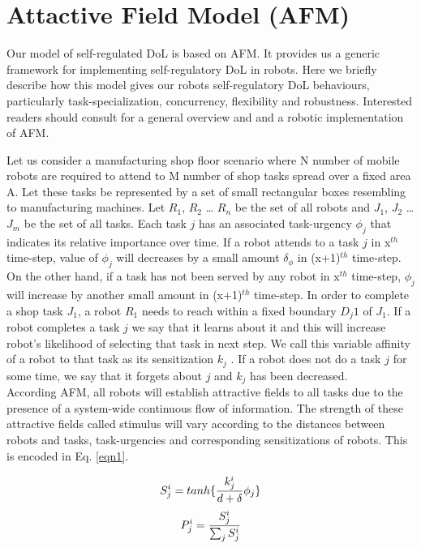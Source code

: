 \documentclass[letterpaper, 10 pt, conference]{ieeeconf}  %
\begin{document}
\section{Attactive Field Model (AFM)}
\label{sec:model}
Our model of self-regulated DoL is based on AFM. It provides us a generic framework for implementing self-regulatory DoL in robots. Here we briefly describe how this model gives our robots self-regulatory DoL behaviours, particularly task-specialization, concurrency, flexibility and robustness. Interested readers should consult \cite{Elsa}  for a general overview and and \cite{Sarker} a robotic implementation of AFM.

Let us consider a manufacturing shop floor scenario where N number of mobile robots are required to attend to M number of shop tasks spread over a fixed area A. Let these tasks be represented by a set of small rectangular boxes resembling to manufacturing machines. Let $R_1$, $R_2$ … $R_n$ be the set of all robots and $J_1$, $J_2$ … $J_m$ be the set of all tasks. Each task $j$ has an associated task-urgency $\phi_j$ that indicates its relative importance over time. If a robot attends to a task $j$ in x$^{th}$ time-step, value of $\phi_j$ will decreases by a small amount $\delta_\phi$ in (x+1)$^{th}$ time-step. On the other hand, if a task has not been served by any robot in x$^{th}$ time-step,  $\phi_j$  will increase by another small amount in (x+1)$^{th}$ time-step. In order to complete a shop task $J_1$, a robot $R_1$ needs to reach within a fixed boundary $D_j1$ of $J_1$. If a robot completes a task $j$ we say that it learns about it and this will increase robot's likelihood of selecting that task in next step. We call this variable affinity of a robot to that task as its sensitization $k_j$ . If a robot does not do a task $j$ for some time, we say that it forgets about $j$ and $k_j$ has been decreased.\\
According AFM, all robots will establish attractive fields to all tasks due to the presence of a system-wide continuous flow of information. The strength of these attractive fields called stimulus will vary according to the distances between robots and tasks, task-urgencies and corresponding  sensitizations of robots. This is encoded in Eq. \ref{eqn1}.
\begin{multicols}{2} 
\begin{equation}
\small
S_{j}^{i} = tanh\{\frac{k_{j}^{i}}{d+\delta } \phi _{j}\}
\label{eqn1}
\end{equation}
\vspace*{0.25cm}
\begin{equation}
\small
P_{j}^{i} = \frac{S_{j}^{i}}{\sum_{j}^{}S_{j}^{i}}
\label{eqn2}
\end{equation}
\end{multicols}
\end{document}
